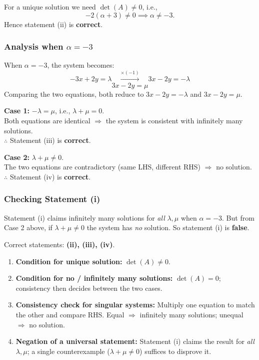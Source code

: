 \documentclass[12pt]{article}
\begin{document}
For a unique solution we need $\det(A) \neq 0$, i.e.,
\[
-2(\alpha+3) \neq 0 \implies \alpha \neq -3.
\]
Hence statement (ii) is \textbf{correct}.

\subsubsection*{Analysis when $\alpha = -3$}

When $\alpha = -3$, the system becomes:
\[
-3x + 2y = \lambda \quad \xrightarrow{\times(-1)} \quad 3x - 2y = -\lambda
\]
\[
3x - 2y = \mu
\]
Comparing the two equations, both reduce to $3x - 2y = -\lambda$ and $3x - 2y = \mu$.

\medskip
\noindent\textbf{Case 1: } $-\lambda = \mu$, i.e., $\lambda + \mu = 0$.\\
Both equations are identical $\Rightarrow$ the system is consistent with infinitely many solutions.\\
$\therefore$ Statement (iii) is \textbf{correct}.

\medskip
\noindent\textbf{Case 2: } $\lambda + \mu \neq 0$.\\
The two equations are contradictory (same LHS, different RHS) $\Rightarrow$ no solution.\\
$\therefore$ Statement (iv) is \textbf{correct}.

\subsubsection*{Checking Statement (i)}

Statement (i) claims infinitely many solutions for \emph{all} $\lambda, \mu$ when $\alpha = -3$. But from Case 2 above, if $\lambda + \mu \neq 0$ the system has \emph{no} solution. So statement (i) is \textbf{false}.

\begin{answerbox}
Correct statements: \textbf{(ii), (iii), (iv)}.
\end{answerbox}

\begin{propbox}
\begin{enumerate}[leftmargin=*, label=\textbf{P\arabic*.}]
  \item \textbf{Condition for unique solution:} $\det(A) \neq 0$.
  \item \textbf{Condition for no / infinitely many solutions:} $\det(A) = 0$; consistency then decides between the two cases.
  \item \textbf{Consistency check for singular systems:} Multiply one equation to match the other and compare RHS. Equal $\Rightarrow$ infinitely many solutions; unequal $\Rightarrow$ no solution.
  \item \textbf{Negation of a universal statement:} Statement (i) claims the result for \emph{all} $\lambda, \mu$; a single counterexample ($\lambda + \mu \neq 0$) suffices to disprove it.
\end{enumerate}
\end{propbox}
\end{document}
